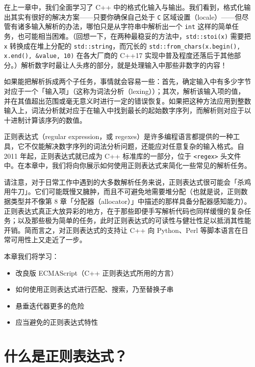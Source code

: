 在上一章中，我们全面学习了 C++ 中的格式化输入与输出。我们看到，格式化输出其实有很好的解决方案——只要你确保自己处于 \texttt{C} 区域设置（locale）——但尽管有诸多输入解析的办法，哪怕只是从字符串中解析出一个 \texttt{int} 这样的简单任务，也可能相当困难。（回想一下，在两种最稳妥的方法中，\texttt{std::\allowbreak{}stoi(\allowbreak{}x)\allowbreak{}} 需要把 \texttt{x} 转换成在堆上分配的 \texttt{std::\allowbreak{}string}，而冗长的 \texttt{std::\allowbreak{}from\_\allowbreak{}chars(\allowbreak{}x.\allowbreak{}begin(\allowbreak{})\allowbreak{},\allowbreak{} x.\allowbreak{}end(\allowbreak{})\allowbreak{},\allowbreak{} \&value,\allowbreak{} 10)\allowbreak{}} 在各大厂商的 C++17 实现中普及程度还落后于其他部分。）解析数字时最让人头疼的部分，就是处理输入中那些非数字的内容！

如果能把解析拆成两个子任务，事情就会容易一些：首先，确定输入中有多少字节对应于一个「输入项」（这称为词法分析（lexing））；其次，解析该输入项的值，并在其值超出范围或毫无意义时进行一定的错误恢复。如果把这种方法应用到整数输入上，词法分析就对应于在输入中找到最长的起始数字序列，而解析则对应于以十进制计算该序列的数值。

正则表达式（regular expression，或 regexes）是许多编程语言都提供的一种工具，它不仅能解决数字序列的词法分析问题，还能应对任意复杂的输入格式。自 2011 年起，正则表达式就已成为 C++ 标准库的一部分，位于 \texttt{<regex>\allowbreak{}} 头文件中。在本章中，我们将向你展示如何使用正则表达式来简化一些常见的解析任务。

请注意，对于日常工作中遇到的大多数解析任务来说，正则表达式很可能会「杀鸡用牛刀」。它们可能既慢又臃肿，而且不可避免地需要堆分配（也就是说，正则数据类型并不像第 8 章「分配器（allocator）」中描述的那样具备分配器感知能力）。正则表达式真正大放异彩的地方，在于那些即便手写解析代码也同样缓慢的复杂任务；以及那些极为简单的任务，此时正则表达式的可读性与健壮性足以抵消其性能开销。简而言之，对正则表达式的支持让 C++ 向 Python、Perl 等脚本语言在日常可用性上又走近了一步。

本章我们将学习：
\begin{itemize}
\item 改良版 ECMAScript（C++ 正则表达式所用的方言）
\item 如何使用正则表达式进行匹配、搜索，乃至替换子串
\item 悬垂迭代器更多的危险
\item 应当避免的正则表达式特性
\end{itemize}

\section{什么是正则表达式？}

